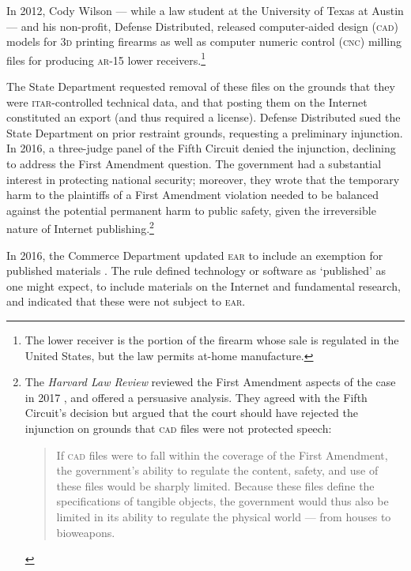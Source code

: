 \documentclass[12pt]{olfmemo}
\begin{document}
In 2012, Cody Wilson --- while a law student at the University of Texas at Austin --- and his non-profit, Defense Distributed, released computer-aided design (\textsc{cad}) models for \textsc{3d} printing firearms as well as computer numeric control (\textsc{cnc}) milling files for producing \textsc{ar}-15 lower receivers.\footnote{The lower receiver is the portion of the firearm whose sale is regulated in the United States, but the law permits at-home manufacture.}

The State Department requested removal of these files on the grounds that they were \textsc{itar}-controlled technical data, and that posting them on the Internet constituted an export (and thus required a license). Defense Distributed sued the State Department on prior restraint grounds, requesting a preliminary injunction. In 2016, a three-judge panel of the Fifth Circuit denied the injunction, declining to address the First Amendment question. The government had a substantial interest in protecting national security; moreover, they wrote that the temporary harm to the plaintiffs of a First Amendment violation needed to be balanced against the potential permanent harm to public safety, given the irreversible nature of Internet publishing.\footnote{The \textit{Harvard Law Review} reviewed the First Amendment aspects of the  case in 2017 \citep{Harvard2017}, and offered a persuasive analysis. They agreed with the Fifth Circuit's decision but argued that the court should have rejected the injunction on grounds that \textsc{cad} files were not protected speech:
\begin{quote}
If \textsc{cad} files were to fall within the coverage of the First Amendment, the government's ability to regulate the content, safety, and use of these files would be sharply limited. Because these files define the specifications of tangible objects, the government would thus also be limited in its ability to regulate the physical world --- from houses to bioweapons.
\end{quote}} \citep{DefenseDistributed2016}

In 2016, the Commerce Department updated \textsc{ear} to include an exemption for published materials \citep{PublishedRule2016}. The rule defined technology or software as `published' as one might expect, to include materials on the Internet and fundamental research, and indicated that these were not subject to \textsc{ear}.
\end{document}
